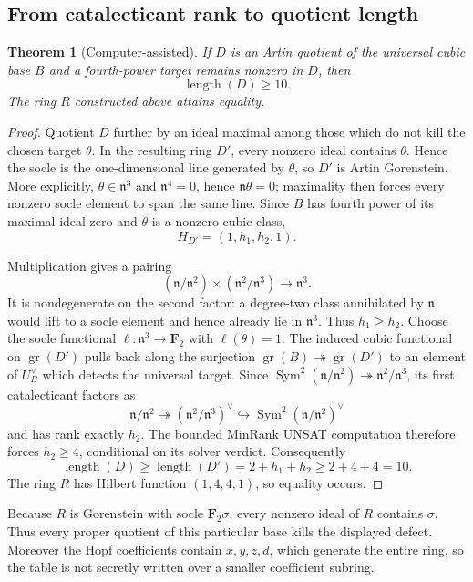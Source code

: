\documentclass[11pt]{article}
\newtheorem{theorem}{Theorem}[section]
\theoremstyle{remark}
\newcommand{\F}{\mathbf F}
\newcommand{\gr}{\operatorname{gr}}
\newcommand{\length}{\operatorname{length}}
\newcommand{\n}{\mathfrak n}
\begin{document}
\subsection{From catalecticant rank to quotient length}

\begin{theorem}[Computer-assisted]\label{thm:minimal-quotient}
If \(D\) is an Artin quotient of the universal cubic base \(B\) and a
fourth-power target remains nonzero in \(D\), then
\[
 \length(D)\ge10.
\]
The ring \(R\) constructed above attains equality.
\end{theorem}

\begin{proof}
Quotient \(D\) further by an ideal maximal among those which do not kill the
chosen target \(\theta\).  In the resulting ring \(D'\), every nonzero ideal
contains \(\theta\).  Hence the socle is the one-dimensional line generated
by \(\theta\), so \(D'\) is Artin Gorenstein.  More explicitly,
\(\theta\in\n^3\) and \(\n^4=0\), hence \(\n\theta=0\); maximality then
forces every nonzero socle element to span the same line.
Since \(B\) has fourth power of its maximal ideal zero and \(\theta\) is a
nonzero cubic class,
\[
 H_{D'}=(1,h_1,h_2,1).
\]

Multiplication gives a pairing
\[
 (\n/\n^2)\times(\n^2/\n^3)\longrightarrow\n^3.
\]
It is nondegenerate on the second factor: a degree-two class annihilated by
\(\n\) would lift to a socle element and hence already lie in \(\n^3\).
Thus \(h_1\ge h_2\).  Choose the socle functional
\(\ell:\n^3\to\F_2\) with \(\ell(\theta)=1\).  The induced cubic functional
on \(\gr(D')\) pulls back along the surjection
\(\gr(B)\twoheadrightarrow\gr(D')\) to an element of \(U_B^\vee\) which
detects the universal target.  Since
\(\operatorname{Sym}^2(\n/\n^2)\twoheadrightarrow\n^2/\n^3\), its first
catalecticant factors as
\[
 \n/\n^2\twoheadrightarrow(\n^2/\n^3)^\vee
 \hookrightarrow\operatorname{Sym}^2(\n/\n^2)^\vee
\]
and has rank exactly \(h_2\).  The bounded MinRank UNSAT computation therefore
forces \(h_2\ge4\), conditional on its solver verdict.  Consequently
\[
 \length(D)\ge\length(D')=2+h_1+h_2\ge2+4+4=10.
\]
The ring \(R\) has Hilbert function \((1,4,4,1)\), so equality occurs.
\end{proof}

Because \(R\) is Gorenstein with socle \(\F_2\sigma\), every nonzero ideal
of \(R\) contains \(\sigma\).  Thus every proper quotient of this particular
base kills the displayed defect.  Moreover the Hopf coefficients contain
\(x,y,z,d\), which generate the entire ring, so the table is not secretly
written over a smaller coefficient subring.
\end{document}

